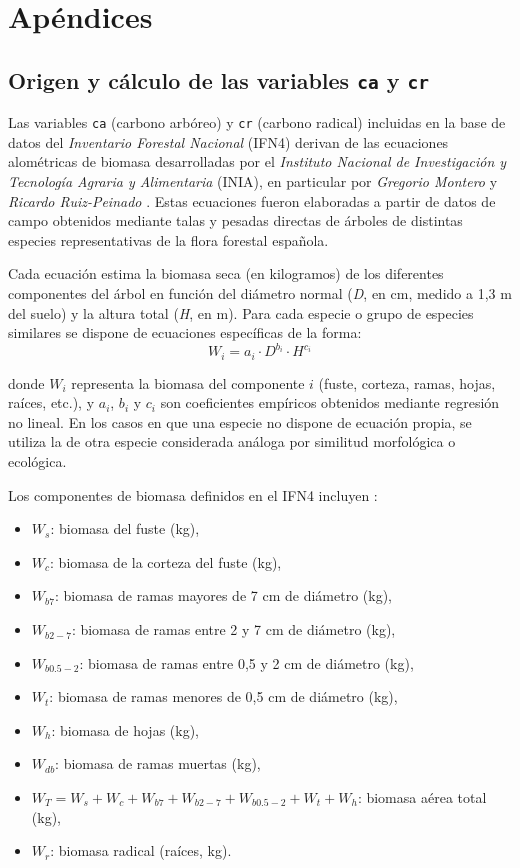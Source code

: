 \section{Apéndices}
\small

\subsection{Origen y cálculo de las variables \texttt{ca} y \texttt{cr}}\label{sec:Carbono}

Las variables \texttt{ca} (carbono arbóreo) y \texttt{cr} (carbono radical) incluidas en la base de datos del \textit{Inventario Forestal Nacional} (IFN4) derivan de las ecuaciones alométricas de biomasa desarrolladas por el \textit{Instituto Nacional de Investigación y Tecnología Agraria y Alimentaria} (INIA), en particular por \textit{Gregorio Montero} y \textit{Ricardo Ruiz-Peinado} \cite{montero2009, ruizpeinado2011}. Estas ecuaciones fueron elaboradas a partir de datos de campo obtenidos mediante talas y pesadas directas de árboles de distintas especies representativas de la flora forestal española.


Cada ecuación estima la biomasa seca (en kilogramos) de los diferentes componentes del árbol en función del diámetro normal (\textit{D}, en cm, medido a 1,3 m del suelo) y la altura total (\textit{H}, en m). Para cada especie o grupo de especies similares se dispone de ecuaciones específicas de la forma:
\[
    W_i = a_i \cdot D^{b_i} \cdot H^{c_i}
\]

donde $W_i$ representa la biomasa del componente $i$ (fuste, corteza, ramas, hojas, raíces, etc.), y $a_i$, $b_i$ y $c_i$ son coeficientes empíricos obtenidos mediante regresión no lineal. En los casos en que una especie no dispone de ecuación propia, se utiliza la de otra especie considerada análoga por similitud morfológica o ecológica.


Los componentes de biomasa definidos en el IFN4 incluyen \cite{miteco_ifn4_manual}:

\begin{itemize}
    \item $W_s$: biomasa del fuste (kg),
    \item $W_c$: biomasa de la corteza del fuste (kg),
    \item $W_{b7}$: biomasa de ramas mayores de 7 cm de diámetro (kg),
    \item $W_{b2-7}$: biomasa de ramas entre 2 y 7 cm de diámetro (kg),
    \item $W_{b0.5-2}$: biomasa de ramas entre 0,5 y 2 cm de diámetro (kg),
    \item $W_t$: biomasa de ramas menores de 0,5 cm de diámetro (kg),
    \item $W_h$: biomasa de hojas (kg),
    \item $W_{db}$: biomasa de ramas muertas (kg),
    \item $W_T = W_s + W_c + W_{b7} + W_{b2-7} + W_{b0.5-2} + W_t + W_h$: biomasa aérea total (kg),
    \item $W_r$: biomasa radical (raíces, kg).
\end{itemize}


